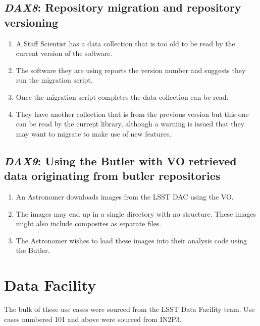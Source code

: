 \documentclass[DM,toc,lsstdraft]{lsstdoc}
\newcommand{\usecase}[3]{%
\subsection{\emph{#1}: #2}
\label{use:#1}
\begin{enumerate}[label=\alph*.]
#3
\end{enumerate}
}
\begin{document}
\usecase{DAX8}{Repository migration and repository versioning}{%

\item
A Staff Scientist has a data collection that is too old to be read by the current version of the software.

\item
The software they are using reports the version number and suggests they run the migration script.

\item
Once the migration script completes the data collection can be read.

\item
They have another collection that is from the previous version but this one can be read by the current library, although a warning is issued that they may want to migrate to make use of new features.

}

\usecase{DAX9}{Using the Butler with VO retrieved data originating from butler repositories}{%

\item
An Astronomer downloads images from the LSST DAC using the VO.

\item
The images may end up in a single directory with no structure.
These images might also include composites as separate files.

\item
The Astronomer wishes to load these images into their analysis code using the Butler.

}

\section{Data Facility}

The bulk of these use cases were sourced from the LSST Data Facility team.
Use cases numbered 101 and above were sourced from IN2P3.
\end{document}
